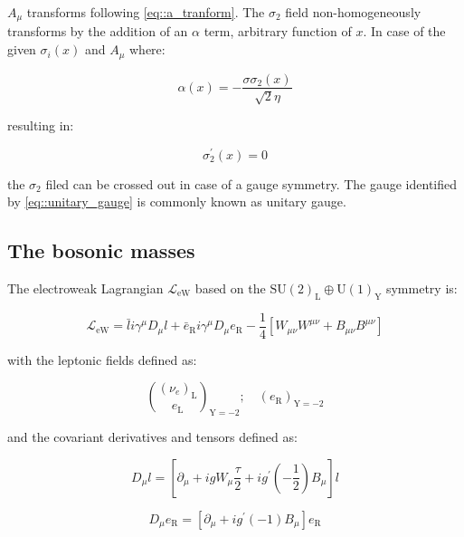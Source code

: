 $A_{\mu}$ transforms following \autoref{eq::a_tranform}. The $\sigma_{2}$ field non-homogeneously transforms by the addition of an $\alpha$ term, arbitrary function of $x$. In case of the given $\sigma_{i}(x)$ and $A_{\mu}$ where:

\begin{equation}
\alpha(x) = -\dfrac{σ\sigma_{2}(x)}{\sqrt{2}\eta}
\end{equation}

resulting in:

\begin{equation}
\sigma^{\prime}_{2}(x) = 0
\label{eq::unitary_gauge}
\end{equation}

the $\sigma_{2}$ filed can be crossed out in case of a gauge symmetry. The gauge identified by \autoref{eq::unitary_gauge} is commonly known as unitary gauge.

\subsection{The bosonic masses}

The electroweak Lagrangian $\mathcal{L}_{\text{eW}}$ based on the $\text{SU}(2)_{\text{L}} \oplus \text{U}(1)_{\text{Y}}$ symmetry is:

\begin{equation}
\mathcal{L}_{\text{eW}} = \bar{l}i\gamma^{\mu} D_{\mu}l + \bar{e}_{\text{R}}i\gamma^{\mu}D_{\mu}e_{\text{R}} - \dfrac{1}{4}[W_{\mu\nu}W^{\mu\nu} +B_{\mu\nu}B^{\mu\nu}]
\label{eq::lagrangian_ew}
\end{equation}

with the leptonic fields defined as:

\begin{equation}
\binom{(\nu_{e})_{\text{L}}}{e_{\text{L}}}_{\text{Y}=−2} ; \quad (e_{\text{R}})_{\text{Y}=−2}
\label{eq::fields_scheme}
\end{equation}

and the covariant derivatives and tensors defined as:

\begin{equation}
D_{\mu}l = [\partial_{\mu} + igW_{\mu} \dfrac{\tau}{2}  + ig^{\prime}(-\dfrac{1}{2})B_{\mu}]l 
\end{equation}

\begin{equation}
D_{\mu}e_{\text{R}} = [\partial_{\mu} + ig^{\prime}(-1)B_{\mu}]e_{\text{R}}
\end{equation}

